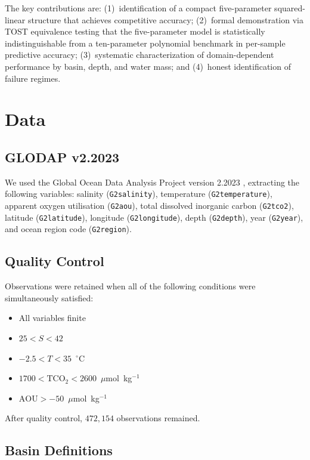 \documentclass[12pt,a4paper]{article}
\begin{document}
The key contributions are: (1)~identification of a compact five-parameter squared-linear structure that achieves competitive accuracy; (2)~formal demonstration via TOST equivalence testing that the five-parameter model is statistically indistinguishable from a ten-parameter polynomial benchmark in per-sample predictive accuracy; (3)~systematic characterization of domain-dependent performance by basin, depth, and water mass; and (4)~honest identification of failure regimes.

\section{Data}
\label{sec:data}

\subsection{GLODAP v2.2023}

We used the Global Ocean Data Analysis Project version 2.2023 \citep{Lauvset2023}, extracting the following variables: salinity (\texttt{G2salinity}), temperature (\texttt{G2temperature}), apparent oxygen utilisation (\texttt{G2aou}), total dissolved inorganic carbon (\texttt{G2tco2}), latitude (\texttt{G2latitude}), longitude (\texttt{G2longitude}), depth (\texttt{G2depth}), year (\texttt{G2year}), and ocean region code (\texttt{G2region}).

\subsection{Quality Control}

Observations were retained when all of the following conditions were simultaneously satisfied:
\begin{itemize}[nosep]
    \item All variables finite
    \item $25 < S < 42$
    \item $-2.5 < T < 35$~$^\circ$C
    \item $1700 < \text{TCO}_2 < 2600$~$\mu$mol~kg$^{-1}$
    \item $\text{AOU} > -50$~$\mu$mol~kg$^{-1}$
\end{itemize}
After quality control, $472{,}154$ observations remained.

\subsection{Basin Definitions}
\end{document}
